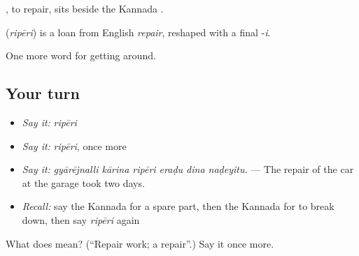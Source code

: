  , to repair, sits beside the Kannada .

\begin{cousinweb}
\textbf{} (\emph{ripēri}) is a loan from English \emph{repair}, reshaped with a final -\emph{i}.
\end{cousinweb}

\begin{grammarlens}[title={What you've built}]
One more word for getting around.
\end{grammarlens}

\subsection*{Your turn}
\begin{itemize}
\raggedright
  \item \emph{Say it:} \emph{ripēri}
  \item \emph{Say it:} \emph{ripēri}, once more
  \item \emph{Say it:} \emph{gyārējnalli kārina ripēri eraḍu dina naḍeyitu.} — The repair of the car at the garage took two days.
  \item \emph{Recall:} say the Kannada for a spare part, then the Kannada for to break down, then say \emph{ripēri} again
\end{itemize}

\begin{tcolorbox}[breakable,colback=teal!4,colframe=teal!35!black,title={Before you move on}]
What does  mean? (\textquotedblleft{}Repair work; a repair\textquotedblright{}.) Say it once more.
\end{tcolorbox}
